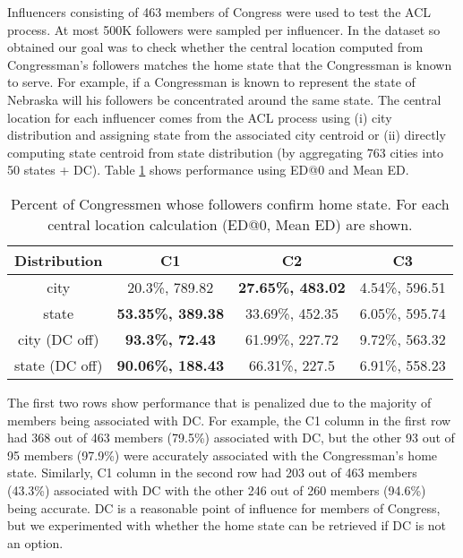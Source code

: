Influencers consisting of 463 members of Congress were used to test the ACL process. At most 500K followers were sampled per influencer. In the dataset so obtained our goal was to check whether the central location computed from Congressman's followers matches the home state that the Congressman is known to serve. For example, if a Congressman is known to represent the state of Nebraska will his followers be concentrated around the same state. The central location for each influencer comes from the ACL process using (i) city distribution and assigning state from the associated city centroid or (ii) directly computing state centroid from state distribution (by aggregating 763 cities into 50 states + DC). Table \ref{table_4_1} shows performance using ED@0 and Mean ED.

\begin{table}
\small
\caption[Percent of Congressmen whose followers confirm home state]{Percent of Congressmen whose followers confirm home state. For each central location calculation (ED@0, Mean ED) are shown.}
\label{table_4_1}
\begin{center}
\begin{tabular}{|c|c|c|c|}
\hline
\bfseries Distribution & \bfseries C1 & \bfseries C2 & \bfseries C3\\
\hline
city&20.3\%, 789.82&\bfseries 27.65\%, 483.02&4.54\%, 596.51\\
\hline
state&\bfseries 53.35\%, 389.38&33.69\%, 452.35&6.05\%, 595.74\\
\hline
city (DC off)&\bfseries 93.3\%, 72.43&61.99\%, 227.72&9.72\%, 563.32\\
\hline
state (DC off)&\bfseries 90.06\%, 188.43&66.31\%, 227.5&6.91\%, 558.23\\
\hline
\end{tabular}
\end{center}
\end{table}

The first two rows show performance that is penalized due to the majority of members being associated with DC. For example, the C1 column in the first row had 368 out of 463 members (79.5\%) associated with DC, but the other 93 out of 95 members (97.9\%) were accurately associated with the Congressman's home state. Similarly, C1 column in the second row had 203 out of 463 members (43.3\%) associated with DC with the other 246 out of 260 members (94.6\%) being accurate. DC is a reasonable point of influence for members of Congress, but we experimented with whether the home state can be retrieved if DC is not an option.

